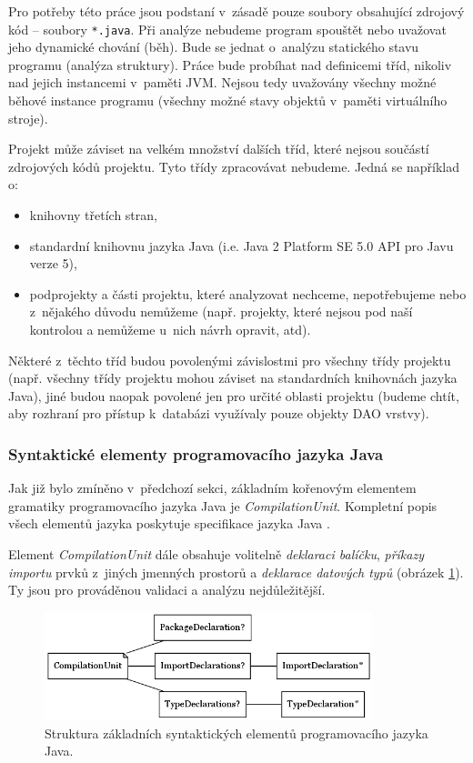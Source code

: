 Pro potřeby této práce jsou podstaní v~zásadě pouze soubory obsahující zdrojový kód -- soubory \verb+*.java+. Při analýze nebudeme program spouštět nebo uvažovat jeho dynamické chování (běh). Bude se jednat o~analýzu statického stavu programu (analýza struktury). Práce bude probíhat nad definicemi tříd, nikoliv nad jejich instancemi v~paměti JVM. Nejsou tedy uvažovány všechny možné běhové instance programu (všechny možné stavy objektů v~paměti virtuálního stroje).

Projekt může záviset na velkém množství dalších tříd, které nejsou součástí zdrojových kódů projektu. Tyto třídy zpracovávat nebudeme. Jedná se například o:

\begin{itemize}
\item knihovny třetích stran,
\item standardní knihovnu jazyka Java (i.e. Java 2 Platform SE 5.0 API pro Javu verze 5),
\item podprojekty a části projektu, které analyzovat nechceme, nepotřebujeme nebo z~nějakého důvodu nemůžeme (např. projekty, které nejsou pod naší kontrolou a nemůžeme u~nich návrh opravit, atd).
\end{itemize}

Některé z~těchto tříd budou povolenými závislostmi pro všechny třídy projektu (např. všechny třídy projektu mohou záviset na standardních knihovnách jazyka Java), jiné budou naopak povolené jen pro určité oblasti projektu (budeme chtít, aby rozhraní pro přístup k~databázi využívaly pouze objekty DAO vrstvy).

\subsubsection{Syntaktické elementy programovacího jazyka Java}
\label{analysis-java_grammar_elements}
Jak již bylo zmíněno v~předchozí sekci, základním kořenovým elementem gramatiky programovacího jazyka Java je \emph{CompilationUnit}. Kompletní popis všech elementů jazyka poskytuje specifikace jazyka Java \cite{Gosling:2005:JLS:1036643}.

Element \emph{CompilationUnit} dále obsahuje volitelně \emph{deklaraci balíčku}, \emph{příkazy importu} prvků z~jiných jmenných prostorů a \emph{deklarace datových typů} (obrázek \ref{toplevel_elements}). Ty jsou pro prováděnou validaci a analýzu nejdůležitější.

\begin{figure}[h!]
  \centering
  \includegraphics[width=0.85\textwidth]{./graphs/java_top_elements.png}
  \caption{Struktura základních syntaktických elementů programovacího jazyka Java.\label{toplevel_elements}}
\end{figure}

